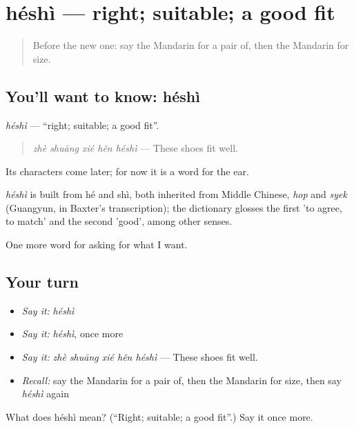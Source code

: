 \section[héshì]{héshì — right; suitable; a good fit}

\label{lesson:ZH-C108-heshi}



\begin{quote}
Before the new one: say the Mandarin for a pair of, then the Mandarin for size.
\end{quote}

\subsection*{You'll want to know: héshì}
\emph{héshì} — \textquotedblleft{}right; suitable; a good fit\textquotedblright{}.

\begin{quote}
\emph{zhè shuāng xié hěn héshì} — These shoes fit well.
\end{quote}

Its characters come later; for now it is a word for the ear.

\begin{cousinweb}
\emph{héshì} is built from hé and shì, both inherited from Middle Chinese, \emph{hop} and \emph{syek} (Guangyun, in Baxter's transcription); the dictionary glosses the first 'to agree, to match' and the second 'good', among other senses.
\end{cousinweb}

\begin{grammarlens}[title={What you've built}]
One more word for asking for what I want.
\end{grammarlens}

\subsection*{Your turn}
\begin{itemize}
\raggedright
  \item \emph{Say it:} \emph{héshì}
  \item \emph{Say it:} \emph{héshì}, once more
  \item \emph{Say it:} \emph{zhè shuāng xié hěn héshì} — These shoes fit well.
  \item \emph{Recall:} say the Mandarin for a pair of, then the Mandarin for size, then say \emph{héshì} again
\end{itemize}

\begin{tcolorbox}[breakable,colback=teal!4,colframe=teal!35!black,title={Before you move on}]
What does héshì mean? (\textquotedblleft{}Right; suitable; a good fit\textquotedblright{}.) Say it once more.
\end{tcolorbox}
